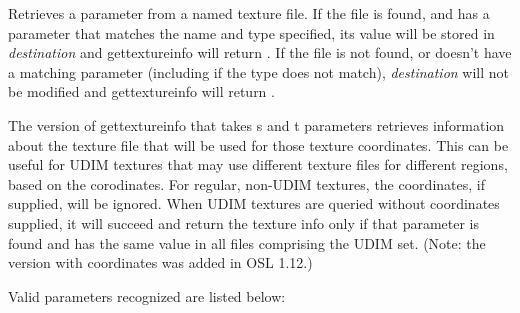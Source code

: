\documentclass[11pt,letterpaper]{book}
\begin{document}
\newpage
{}

Retrieves a parameter from a named texture file.  If the file is found,
and has a parameter that matches the name and type specified, its value
will be stored in \emph{destination} and {\cf gettextureinfo} will
return {}.  If the file is not found, or doesn't have a matching
parameter (including if the type does not match), \emph{destination}
will not be modified and {\cf gettextureinfo} will return {}.

The version of {\cf gettextureinfo} that takes {\cf s} and {\cf t} parameters
retrieves information about the texture file that will be used for those
texture coordinates. This can be useful for UDIM textures that may use
different texture files for different regions, based on the corodinates. For
regular, non-UDIM textures, the coordinates, if supplied, will be ignored.
When UDIM textures are queried without coordinates supplied, it will succeed
and return the texture info only if that parameter is found and has the same
value in all files comprising the UDIM set. (Note: the version with
coordinates was added in OSL 1.12.)

Valid parameters recognized are listed below:

\smallskip
\end{document}
